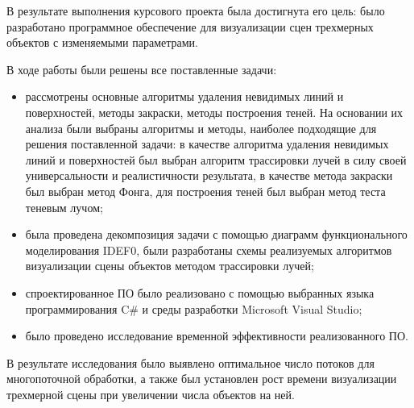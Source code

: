 
В результате выполнения курсового проекта была достигнута его цель: было разработано программное обеспечение для визуализации сцен трехмерных объектов с изменяемыми параметрами. 

В ходе работы были решены все поставленные задачи:
\begin{itemize}
	\item рассмотрены основные алгоритмы удаления невидимых линий и поверхностей, методы закраски, методы построения теней. На основании их анализа были выбраны алгоритмы и методы, наиболее подходящие для решения поставленной задачи: в качестве алгоритма удаления невидимых линий и поверхностей был выбран алгоритм трассировки лучей в силу своей универсальности и реалистичности результата, в качестве метода закраски был выбран метод Фонга, для построения теней был выбран метод теста теневым лучом;
	\item была проведена декомпозиция задачи с помощью диаграмм функционального моделирования IDEF0, были разработаны схемы реализуемых алгоритмов визуализации сцены объектов методом трассировки лучей;
	\item спроектированное ПО было реализовано с помощью выбранных языка программирования C\# и среды разработки Microsoft Visual Studio;
	\item было проведено исследование временной эффективности реализованного ПО.
\end{itemize}

В результате исследования было выявлено оптимальное число потоков для многопоточной обработки, а также был установлен рост времени визуализации трехмерной сцены при увеличении числа объектов на ней.